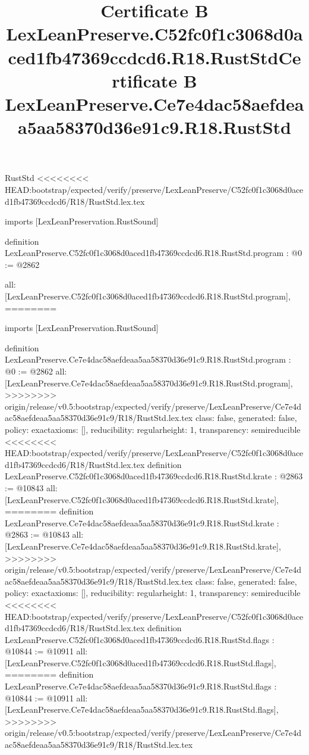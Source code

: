 \begin{lexlean}{RustStd}
<<<<<<<< HEAD:bootstrap/expected/verify/preserve/LexLeanPreserve/C52fc0f1c3068d0aced1fb47369ccdcd6/R18/RustStd.lex.tex
\title{Certificate B LexLeanPreserve.C52fc0f1c3068d0aced1fb47369ccdcd6.R18.RustStd}
\begin{coremodule}
imports [LexLeanPreservation.RustSound]

definition LexLeanPreserve.C52fc0f1c3068d0aced1fb47369ccdcd6.R18.RustStd.program : @0 := @2862 {
  all: [LexLeanPreserve.C52fc0f1c3068d0aced1fb47369ccdcd6.R18.RustStd.program],
========
\title{Certificate B LexLeanPreserve.Ce7e4dac58aefdeaa5aa58370d36e91c9.R18.RustStd}
\begin{coremodule}
imports [LexLeanPreservation.RustSound]

definition LexLeanPreserve.Ce7e4dac58aefdeaa5aa58370d36e91c9.R18.RustStd.program : @0 := @2862 {
  all: [LexLeanPreserve.Ce7e4dac58aefdeaa5aa58370d36e91c9.R18.RustStd.program],
>>>>>>>> origin/release/v0.5:bootstrap/expected/verify/preserve/LexLeanPreserve/Ce7e4dac58aefdeaa5aa58370d36e91c9/R18/RustStd.lex.tex
  class: false,
  generated: false,
  policy: exact{axioms: []},
  reducibility: regular{height: 1},
  transparency: semireducible
}
<<<<<<<< HEAD:bootstrap/expected/verify/preserve/LexLeanPreserve/C52fc0f1c3068d0aced1fb47369ccdcd6/R18/RustStd.lex.tex
definition LexLeanPreserve.C52fc0f1c3068d0aced1fb47369ccdcd6.R18.RustStd.krate : @2863 := @10843 {
  all: [LexLeanPreserve.C52fc0f1c3068d0aced1fb47369ccdcd6.R18.RustStd.krate],
========
definition LexLeanPreserve.Ce7e4dac58aefdeaa5aa58370d36e91c9.R18.RustStd.krate : @2863 := @10843 {
  all: [LexLeanPreserve.Ce7e4dac58aefdeaa5aa58370d36e91c9.R18.RustStd.krate],
>>>>>>>> origin/release/v0.5:bootstrap/expected/verify/preserve/LexLeanPreserve/Ce7e4dac58aefdeaa5aa58370d36e91c9/R18/RustStd.lex.tex
  class: false,
  generated: false,
  policy: exact{axioms: []},
  reducibility: regular{height: 1},
  transparency: semireducible
}
<<<<<<<< HEAD:bootstrap/expected/verify/preserve/LexLeanPreserve/C52fc0f1c3068d0aced1fb47369ccdcd6/R18/RustStd.lex.tex
definition LexLeanPreserve.C52fc0f1c3068d0aced1fb47369ccdcd6.R18.RustStd.flags : @10844 := @10911 {
  all: [LexLeanPreserve.C52fc0f1c3068d0aced1fb47369ccdcd6.R18.RustStd.flags],
========
definition LexLeanPreserve.Ce7e4dac58aefdeaa5aa58370d36e91c9.R18.RustStd.flags : @10844 := @10911 {
  all: [LexLeanPreserve.Ce7e4dac58aefdeaa5aa58370d36e91c9.R18.RustStd.flags],
>>>>>>>> origin/release/v0.5:bootstrap/expected/verify/preserve/LexLeanPreserve/Ce7e4dac58aefdeaa5aa58370d36e91c9/R18/RustStd.lex.tex
}}}
\end{coremodule}}
\end{coremodule}
\end{lexlean}
